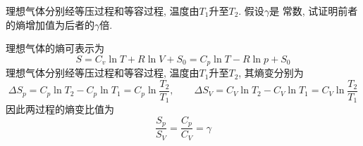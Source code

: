 \begin{problem}[1.16]
理想气体分别经等压过程和等容过程, 温度由$T_1$升至$T_2$. 假设$\gamma$是
常数, 试证明前者的熵增加值为后者的$\gamma$倍.
\end{problem}
\begin{solution}
理想气体的熵可表示为
\[
S = C_v\ln T + R\ln V + S_0 = C_p\ln T -R\ln p + S_0
\]
理想气体分别经等压过程和等容过程, 温度由$T_1$升至$T_2$, 其熵变分别为
\[
\Delta S_p = C_p\ln T_2 - C_p\ln T_1 = C_p\ln \frac{T_2}{T_1}, \qquad 
\Delta S_V = C_V\ln T_2 - C_V\ln T_1 = C_V\ln \frac{T_2}{T_1}
\]
因此两过程的熵变比值为
\[
\frac{S_p}{S_V} = \frac{C_p}{C_V} = \gamma
\]
\end{solution}
